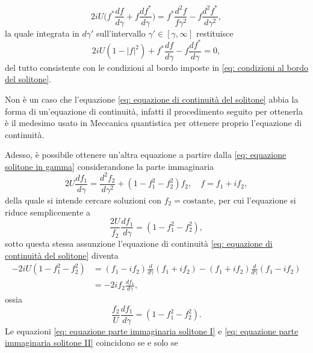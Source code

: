 \begin{equation}
    2iU\bigg(f^*\frac{df}{d\gamma} + f\frac{df^*}{d\gamma}\bigg) = f^*\dfrac{d^2f}{f\gamma^2} - f\frac{d^2f^*}{d\gamma^2},
\end{equation}
la quale integrata in $d\gamma'$ sull'intervallo $\gamma' \in [\gamma,\infty]$ restituisce
\begin{equation}
\label{eq: equazione di continuità del solitone}
    2iU(1 - |f|^2) + f^*\frac{df}{d\gamma} - f\frac{df^*}{d\gamma} = 0,
\end{equation}
del tutto consistente con le condizioni al bordo imposte in \eqref{eq: condizioni al bordo del solitone}.
\begin{obs}
    Non è un caso che l'equazione \eqref{eq: equazione di continuità del solitone} abbia la forma di un'equazione di continuità, infatti il procedimento seguito per ottenerla è il medesimo usato in Meccanica quantistica per ottenere proprio l'equazione di continuità.
\end{obs}
Adesso, è possibile ottenere un'altra equazione a partire dalla \eqref{eq: equazione solitone in gamma} considerandone la parte immaginaria
\begin{equation}
    2U\frac{df_1}{d\gamma} = \frac{d^2f_2}{d\gamma^2} + (1 - f_1^2 - f_2^2)f_2,\quad f = f_1 + if_2,
\end{equation}
della quale si intende cercare soluzioni con $f_2 = \mathrm{costante}$, per cui l'equazione si riduce semplicemente a
\begin{equation}
\label{eq: equazione parte immaginaria solitone I}
    \frac{2U}{f_2}\frac{df_1}{d\gamma} = (1 - f_1^2 - f_2^2),
\end{equation}
sotto questa stessa assunzione l'equazione di continuità \eqref{eq: equazione di continuità del solitone} diventa 
\begin{equation}
    \begin{split}
        -2iU(1 - f_1^2 - f_2^2) &= (f_1 - if_2)\frac{d}{d\gamma}(f_1 + if_2) - (f_1 + if_2)\frac{d}{d\gamma}(f_1 - if_2) \\
        &= -2if_2\frac{df_1}{d\gamma},
    \end{split}
\end{equation}
ossia
\begin{equation}
\label{eq: equazione parte immaginaria solitone II}
    \frac{f_2}{U}\frac{df_1}{d\gamma} = (1 - f_1^2 - f_2^2).
\end{equation}
Le equazioni \eqref{eq: equazione parte immaginaria solitone I} e \eqref{eq: equazione parte immaginaria solitone II} coincidono se e solo se 
